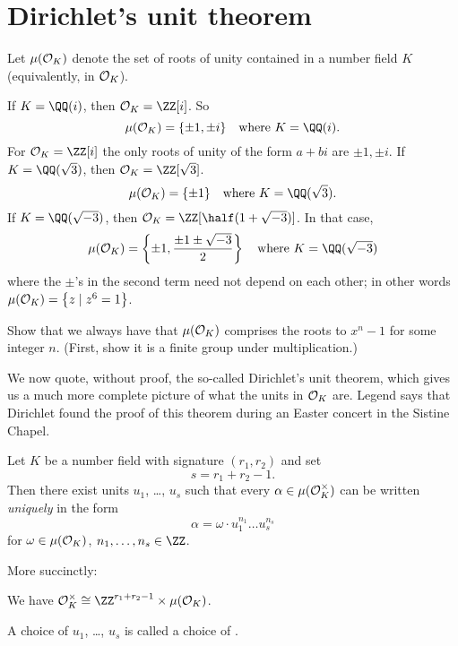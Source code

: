 \section{Dirichlet's unit theorem}

\begin{definition}
	Let $\mu(\OO_K)$ denote the set of roots of unity
	contained in a number field $K$ (equivalently, in $\mathcal O_K$).
\end{definition}
\begin{example}[Examples of $\mu(\OO_K)$]
	\listhack
	\begin{enumerate}[(a)]
		\ii If $K = \QQ(i)$, then $\OO_K = \ZZ[i]$. So
		\[ \mu(\OO_K) = \{\pm1, \pm i\} \quad\text{where } K = \QQ(i). \]
		For $\OO_K = \ZZ[i]$ the only roots of unity of the form $a+bi$ are $\pm 1, \pm i$.
		\ii If $K = \QQ(\sqrt3)$, then $\OO_K = \ZZ[\sqrt 3]$.
		\[ \mu(\OO_K) = \{\pm 1\} \quad\text{where } K = \QQ(\sqrt 3). \]
		\ii If $K = \QQ(\sqrt{-3})$, then $\OO_K = \ZZ[\half(1+\sqrt{-3})]$.
		In that case,
		\[ \mu(\OO_K)
			= \left\{ \pm 1, \frac{\pm 1 \pm \sqrt{-3}}{2} \right\}
			\quad\text{where } K = \QQ(\sqrt{-3})
		\]
		where the $\pm$'s in the second term need not depend on each other;
		in other words $\mu(\mathcal O_K) = \left\{ z \mid z^6=1 \right\}$.
	\end{enumerate}
\end{example}
\begin{exercise}
	Show that we always have that $\mu(\OO_K)$
	comprises the roots to $x^n-1$ for some integer $n$.
	(First, show it is a finite group under multiplication.)
\end{exercise}

We now quote, without proof, the so-called Dirichlet's unit theorem,
which gives us a much more complete picture of what the units in $\mathcal O_K$ are.
Legend says that Dirichlet found the proof of this theorem
during an Easter concert in the Sistine Chapel.
\begin{theorem}
	Let $K$ be a number field with signature $(r_1, r_2)$ and set
	\[ s = r_1 + r_2 - 1. \]
	Then there exist units $u_1$, \dots, $u_s$ such that every $\alpha \in \mu(\mathcal O_K^\times)$
	can be written \emph{uniquely} in the form
	\[ \alpha = \omega \cdot u_1^{n_1} \dots u_s^{n_s} \]
	for $\omega \in \mu(\mathcal O_K)$, $n_1, \dots, n_s \in \ZZ$.
\end{theorem}
More succinctly:
\begin{moral}
We have $\OO_K^\times \cong \ZZ^{r_1+r_2-1} \times \mu(\OO_K)$.
\end{moral}
A choice of $u_1$, \dots, $u_s$ is called a choice of .

